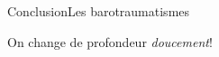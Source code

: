 

\begin{frame}{Conclusion}{Les barotraumatismes}
\huge
\begin{exampleblock}{}
On change de profondeur \emph{doucement}!
\end{exampleblock}
\end{frame}

